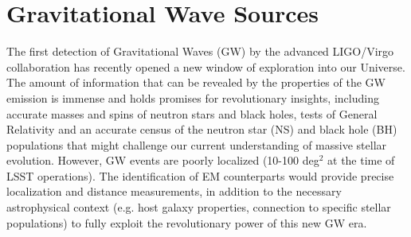 %
%
%
%
%
%
%

\section{Gravitational Wave Sources}
\def\secname{gw}\label{sec:\secname}



The first detection of Gravitational Waves (GW) by the advanced LIGO/Virgo collaboration \citep{Abbott16, Abbott09, Acernese08} has recently opened a new window of exploration into our Universe. The amount of information that can be revealed by the properties of the GW emission is immense and holds promises for revolutionary insights, including accurate masses and spins of neutron stars and black holes, tests of General Relativity and an accurate census of the neutron star (NS) and black hole (BH) populations that might challenge our current understanding of massive stellar evolution. However, GW events are poorly localized (10-100 deg$^2$ at the time of LSST operations). The identification of EM counterparts would provide precise localization and distance measurements, in addition to the necessary astrophysical context (e.g. host galaxy properties, connection to specific stellar populations) to fully exploit the revolutionary power of this new GW era.


